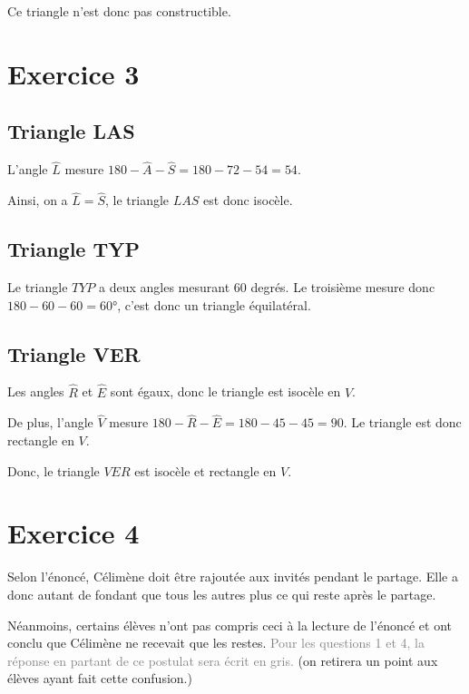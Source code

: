 Ce triangle n'est donc pas constructible.

\section*{Exercice 3}

\subsection*{Triangle LAS}  

L'angle $\widehat{L}$ mesure $180-\widehat{A}-\widehat{S}=180-72-54=54$.

Ainsi, on a $\widehat{L}=\widehat{S}$, le triangle $LAS$ est donc isocèle.

\subsection*{Triangle TYP}  

Le triangle $TYP$ a deux angles mesurant 60 degrés. Le troisième mesure donc $180-60-60=60$°, c'est donc un triangle équilatéral.

\subsection*{Triangle VER}  

Les angles $\widehat{R}$ et $\widehat{E}$ sont égaux, donc le triangle est isocèle en $V$.

De plus, l'angle $\widehat{V}$ mesure $180-\widehat{R}-\widehat{E}=180-45-45=90$. Le triangle est donc rectangle en $V$.

Donc, le triangle $VER$ est isocèle et rectangle en $V$.



\section*{Exercice 4}

Selon l'énoncé, Célimène doit être rajoutée aux invités pendant le partage. Elle a donc autant de fondant que tous les autres plus ce qui reste après le partage. 

Néanmoins, certains élèves n'ont pas compris ceci à la lecture de l'énoncé et ont conclu que Célimène ne recevait que les restes. \textcolor{gray}{Pour les questions 1 et 4, la réponse en partant de ce postulat sera écrit en gris.} (on retirera un point aux élèves ayant fait cette confusion.) 

